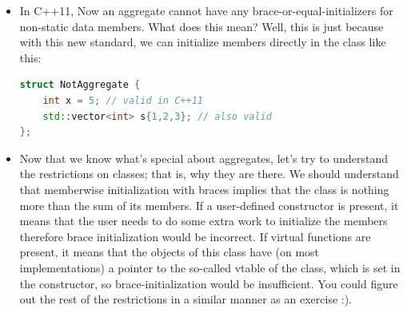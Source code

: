 \documentclass[a4paper,12pt,twoside]{book}
\begin{document}
\begin{itemize}
\item In C++11, Now an aggregate cannot have any brace-or-equal-initializers for non-static data members. What does this mean? Well, this is just because with this new standard, we can initialize members directly in the class like this:
\begin{lstlisting}[frame=single, language=c++]
struct NotAggregate {
    int x = 5; // valid in C++11
    std::vector<int> s{1,2,3}; // also valid
};
\end{lstlisting}


\item Now that we know what's special about aggregates, let's try to understand the restrictions on classes; that is, why they are there. We should understand that memberwise initialization with braces implies that the class is nothing more than the sum of its members. If a user-defined constructor is present, it means that the user needs to do some extra work to initialize the members therefore brace initialization would be incorrect. If virtual functions are present, it means that the objects of this class have (on most implementations) a pointer to the so-called vtable of the class, which is set in the constructor, so brace-initialization would be insufficient. You could figure out the rest of the restrictions in a similar manner as an exercise :).

\end{itemize}
\end{document}
